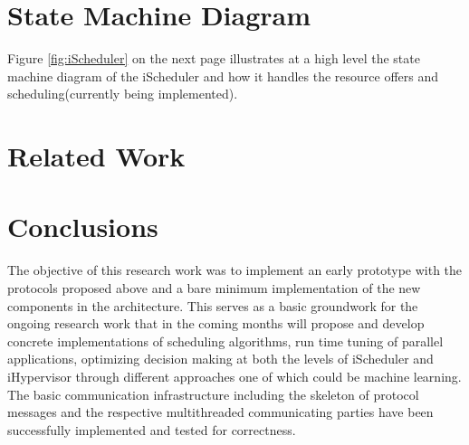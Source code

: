 \documentclass{acm_proc_article-sp}
\begin{document}
\section{State Machine Diagram}
Figure \ref{fig:iScheduler} on the next page illustrates at a high level the state machine diagram of the iScheduler and how it handles the resource offers and scheduling(currently being implemented).
\section{Related Work}
\section{Conclusions}
The objective of this research work was to implement an early prototype with the protocols proposed above and a bare minimum implementation of the new components in the architecture. This serves as a basic groundwork for the ongoing research work that in the coming months will propose and develop concrete implementations of scheduling algorithms, run time tuning of parallel applications, optimizing decision making at both the levels of iScheduler and iHypervisor through different approaches one of which could be machine learning. The basic communication infrastructure including the skeleton of protocol messages and the respective multithreaded communicating parties have been successfully implemented and tested for correctness.


\nocite{felix,laxmikant,nikolas,rudolph,isaias,andreas,georgiou,travis,gladys,klein,pavan,jette,slurm}
%
%
\balancecolumns
\end{document}
